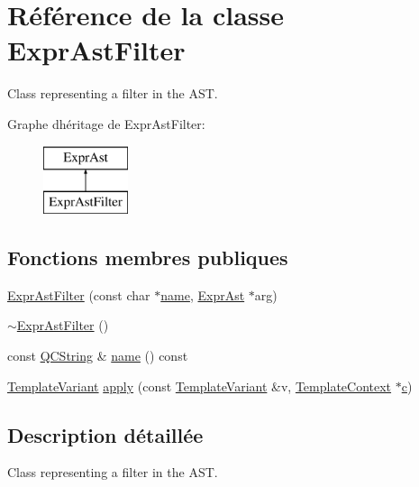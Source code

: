 \hypertarget{class_expr_ast_filter}{}\section{Référence de la classe Expr\+Ast\+Filter}
\label{class_expr_ast_filter}


Class representing a filter in the A\+S\+T.  


Graphe d\textquotesingle{}héritage de Expr\+Ast\+Filter\+:\begin{figure}[H]
\begin{center}
\leavevmode
\includegraphics[height=2.000000cm]{class_expr_ast_filter}
\end{center}
\end{figure}
\subsection*{Fonctions membres publiques}
\begin{DoxyCompactItemize}
\item 
\hyperlink{class_expr_ast_filter_a850d9eeab8c17d7f795920cf40800626}{Expr\+Ast\+Filter} (const char $\ast$\hyperlink{class_expr_ast_filter_a729f877d2fed6a4c54dbbcbaa0f46577}{name}, \hyperlink{class_expr_ast}{Expr\+Ast} $\ast$arg)
\item 
\hyperlink{class_expr_ast_filter_ac7670a7a14d23746924b14878a8c3031}{$\sim$\+Expr\+Ast\+Filter} ()
\item 
const \hyperlink{class_q_c_string}{Q\+C\+String} \& \hyperlink{class_expr_ast_filter_a729f877d2fed6a4c54dbbcbaa0f46577}{name} () const 
\item 
\hyperlink{class_template_variant}{Template\+Variant} \hyperlink{class_expr_ast_filter_aa3af204f6742e748f10b8e690d20d86a}{apply} (const \hyperlink{class_template_variant}{Template\+Variant} \&v, \hyperlink{class_template_context}{Template\+Context} $\ast$\hyperlink{060__command__switch_8tcl_ab14f56bc3bd7680490ece4ad7815465f}{c})
\end{DoxyCompactItemize}


\subsection{Description détaillée}
Class representing a filter in the A\+S\+T. 

